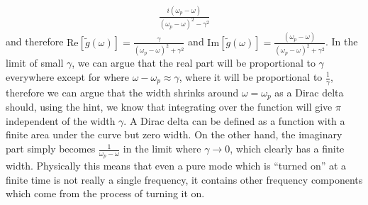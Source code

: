 \documentclass[english]{article}
\begin{document}
\begin{enumerate}
\begin{itemize}
\begin{align}
 \frac{i(\omega_p-\omega)}{(\omega_p-\omega)^2-\gamma^2}
 \end{align}
 and therefore $\mathrm{Re}[ \tilde{g}(\omega)]=\frac{\gamma}{(\omega_p-\omega)^2+\gamma^2}$ and $\mathrm{Im}[ \tilde{g}(\omega)]=\frac{(\omega_p-\omega)}{(\omega_p-\omega)^2+ \gamma^2}$. In the limit of small $\gamma$, we can argue that the real part will be proportional to $\gamma$ everywhere except for where $\omega-\omega_p\approx \gamma$, where it will be proportional to $\frac{1}{\gamma}$, therefore we can argue that the width shrinks around $\omega=\omega_p$ as a Dirac delta should, using the hint, we know that integrating over the function will give $\pi$ independent of the width $\gamma$. A Dirac delta can be defined as a function with a finite area under the curve but zero width. On the other hand, the imaginary part simply becomes $\frac{1}{\omega_p-\omega}$ in the limit where $\gamma \rightarrow 0$, which clearly has a finite width. Physically this means that even a pure mode which is ``turned on'' at a finite time is not really a single frequency, it contains other frequency components which come from the process of turning it on.
 

\end{itemize}
\end{enumerate}
\end{document}
